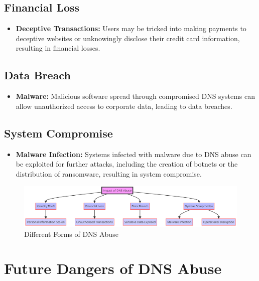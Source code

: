 \subsection{Financial Loss}
\begin{itemize}
    \item \textbf{Deceptive Transactions:} Users may be tricked into making payments to deceptive websites or unknowingly disclose their credit card information, resulting in financial losses.\cite{godaddy2023dnsabuse, bohme2013economics}
\end{itemize}

\subsection{Data Breach}
\begin{itemize}
    \item \textbf{Malware:} Malicious software spread through compromised DNS systems can allow unauthorized access to corporate data, leading to data breaches.\cite{icann2022dnsabusetrends, fowler2016data}
\end{itemize}

\subsection{System Compromise}
\begin{itemize}
    \item \textbf{Malware Infection:} Systems infected with malware due to DNS abuse can be exploited for further attacks, including the creation of botnets or the distribution of ransomware, resulting in system compromise.\cite{dotmagazine2022dnsabuse, saxe2018malware}
\end{itemize}
\captionsetup{font= small}
\begin{figure}[ht!]
\centering
\includegraphics[width=1.0\textwidth]{background/DNSabuseHarm.png}
\caption{Different Forms of DNS Abuse}
\label{fig:figureFour}
\end{figure}


\section{Future Dangers of DNS Abuse}

